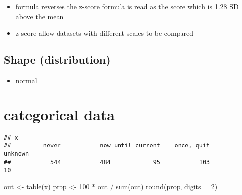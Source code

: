 \documentclass[
]{book}
\newenvironment{Shaded}{\begin{snugshade}}{\end{snugshade}}
\newcommand{\AttributeTok}[1]{\textcolor[rgb]{0.77,0.63,0.00}{#1}}
\newcommand{\DecValTok}[1]{\textcolor[rgb]{0.00,0.00,0.81}{#1}}
\newcommand{\FunctionTok}[1]{\textcolor[rgb]{0.00,0.00,0.00}{#1}}
\newcommand{\NormalTok}[1]{#1}
\newcommand{\OtherTok}[1]{\textcolor[rgb]{0.56,0.35,0.01}{#1}}
\newcommand{\SpecialCharTok}[1]{\textcolor[rgb]{0.00,0.00,0.00}{#1}}
\newcommand{\StringTok}[1]{\textcolor[rgb]{0.31,0.60,0.02}{#1}}
\providecommand{\tightlist}{%
  \setlength{\itemsep}{0pt}\setlength{\parskip}{0pt}}
\theoremstyle{definition}
\theoremstyle{definition}
\theoremstyle{definition}
\theoremstyle{definition}
\theoremstyle{remark}
\begin{document}
\begin{itemize}
\tightlist
\item
  formula reverses the z-score formula is read as the score which is 1.28 SD above the mean
\item
  z-score allow datasets with different scales to be compared
\end{itemize}

\hypertarget{shape-distribution}{%
\subsection{Shape (distribution)}\label{shape-distribution}}

\begin{itemize}
\tightlist
\item
  normal
\end{itemize}

\hypertarget{categorical-data}{%
\section{categorical data}\label{categorical-data}}

\begin{Shaded}
\end{Shaded}

\begin{verbatim}
## x
##         never           now until current    once, quit       unknown 
##           544           484            95           103            10
\end{verbatim}

\begin{Shaded}
\begin{Highlighting}[]
\NormalTok{out }\OtherTok{\textless{}{-}} \FunctionTok{table}\NormalTok{(x)}
\NormalTok{prop }\OtherTok{\textless{}{-}} \DecValTok{100} \SpecialCharTok{*}\NormalTok{ out }\SpecialCharTok{/} \FunctionTok{sum}\NormalTok{(out)}
\FunctionTok{round}\NormalTok{(prop, }\AttributeTok{digits =} \DecValTok{2}\NormalTok{)}
\end{Highlighting}
\end{Shaded}
\end{document}
